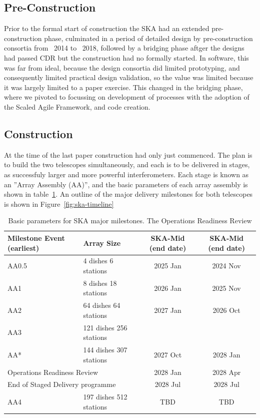 \documentclass[a4paper,
               biblatex,     %
               keeplastbox,   %
               ]{jacow}
\begin{document}
\subsection{Pre-Construction}
Prior to the formal start of construction the SKA had an extended pre-construction phase, culminated in a period of detailed design by pre-construction consortia from ~2014 to ~2018, followed by a bridging phase aftger the designs had passed CDR but the construction had no formally started. In software, this was far from ideal, because the design consortia did limited prototyping, and consequently limited practical design validation, so the value was limited because it was largely limited to a paper exercise. This changed in the bridging phase, where we pivoted to focussing on development of processes with the adoption of the Scaled Agile Framework, and code creation.

\subsection{Construction}
At the time of the last paper construction had only just commenced. The plan is to build the two telescopes simultaneously, and each is to be delivered in stages, as successfuly larger and more powerful interferometers. Each stage is known as an ''Array Assembly (AA)'', and the basic parameters of each array assembly is shown in table~\ref{tab:array-assemblies}. An outline of the major delivery milestones for both telescopes is shown in Figure~\ref{fig:ska-timeline}

\begin{table}[!h]
	\centering
	\caption{Basic parameters for SKA major milestones. The Operations Readiness Review }
        \begin{tabular}{llcc}
            \toprule
            Milestone Event (earliest) & Array Size & SKA-Mid (end date) & SKA-Mid (end date)\\
            \midrule
            AA0.5 & 4 dishes 6 stations   & 2025 Jan & 2024 Nov\\
            AA1   & 8 dishes 18 stations  & 2026 Jan & 2025 Nov\\
            AA2   & 64 dishes 64 stations & 2027 Jan & 2026 Oct\\
            AA3 & 121 dishes 256 stations &  & \\
            AA* & 144 dishes 307 stations & 2027 Oct & 2028 Jan\\
            \multicolumn{2}{l}{Operations Readiness Review} & 2028 Jan & 2028 Apr\\
            \multicolumn{2}{l}{End of Staged Delivery programme} & 2028 Jul & 2028 Jul\\
            AA4 & 197 dishes 512 stations & TBD & TBD\\
            \bottomrule
        \end{tabular}
	\label{tab:array-assemblies}
 \end{table}
\end{document}

